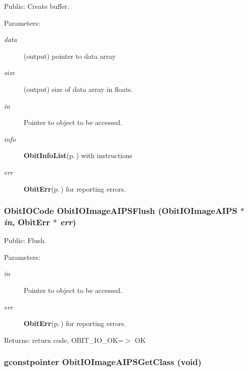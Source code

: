 Public: Create buffer. 

\begin{Desc}
\item[Parameters:]
\begin{description}
\item[{\em data}](output) pointer to data array \item[{\em size}](output) size of data array in floats. \item[{\em in}]Pointer to object to be accessed. \item[{\em info}]{\bf Obit\-Info\-List}{\rm (p.\,\pageref{structObitInfoList})} with instructions \item[{\em err}]{\bf Obit\-Err}{\rm (p.\,\pageref{structObitErr})} for reporting errors. \end{description}
\end{Desc}
\subsubsection{\setlength{\rightskip}{0pt plus 5cm}Obit\-IOCode Obit\-IOImage\-AIPSFlush ({\bf Obit\-IOImage\-AIPS} $\ast$ {\em in}, {\bf Obit\-Err} $\ast$ {\em err})}\label{ObitIOImageAIPS_8h_a15}


Public: Flush. 

\begin{Desc}
\item[Parameters:]
\begin{description}
\item[{\em in}]Pointer to object to be accessed. \item[{\em err}]{\bf Obit\-Err}{\rm (p.\,\pageref{structObitErr})} for reporting errors. \end{description}
\end{Desc}
\begin{Desc}
\item[Returns:]return code, OBIT\_\-IO\_\-OK=$>$ OK \end{Desc}
\subsubsection{\setlength{\rightskip}{0pt plus 5cm}gconstpointer Obit\-IOImage\-AIPSGet\-Class (void)}\label{ObitIOImageAIPS_8h_a5}


